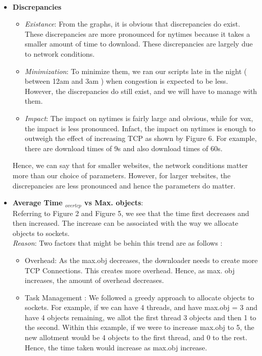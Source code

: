 \documentclass[12pt]{article}
\begin{document}
~\\
\begin{itemize}
\item \textbf{Discrepancies}\\
\begin{itemize}
\item \textit{Existance}: From the graphs, it is obvious that discrepancies do exist. These discrepancies are more pronounced for nytimes because it takes a smaller amount of time to download. These discrepancies are largely due to network conditions. 
\item \textit{Minimization}: To minimize them, we ran our scripts late in the night ( between 12am and 3am ) when congestion is expected to be less. However, the discrepancies do still exist, and we will have to manage with them. 
\item \textit{Impact}: The impact on nytimes is fairly large and obvious, while for vox, the impact is less pronounced. Infact, the impact on nytimes is enough to outweigh the effect of increasing TCP as shown by Figure 6. For example, there are download times of 9s and also download times of 60s.
\end{itemize}
Hence, we can say that for smaller websites, the network conditions matter more than our choice of parameters. However, for larger websites, the discrepancies are less pronounced and hence the parameters do matter.
\item \textbf{Average Time $_{over tcp}$ vs Max. objects}:\\ Referring to Figure 2 and Figure 5, we see that the time first decreases and then increased. The increase can be associated with the way we allocate objects to sockets.
\\ \textit{Reason}: Two factors that might be behin this trend are as follows : \begin{itemize}
\item Overhead: As the max.obj decreases, the downloader needs to create more TCP Connections. This creates more overhead. Hence, as max. obj increases, the amount of overhead decreases.
\item Task Management : We followed a greedy approach to allocate objects to sockets. For example, if we can have 4 threads, and have max.obj = 3 and have 4 objects remaining, we allot the first thread 3 objects and then 1 to the second. Within this example, if we were to increase max.obj to 5, the new allotment would be 4 objects to the first thread, and 0 to the rest. Hence, the time taken would increase as max.obj increase. 

\end{itemize}
\end{itemize}
\end{document}
